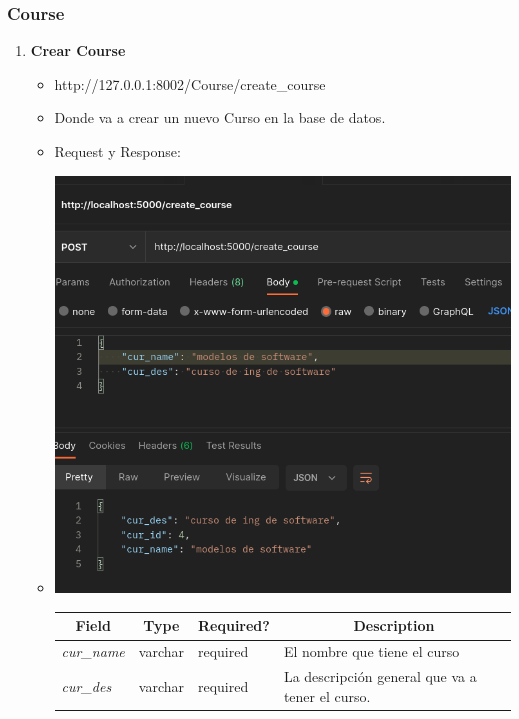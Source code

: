 \documentclass{article}
\begin{document}
\subsubsection{Course}
\begin{enumerate}
    \item \textbf{Crear Course}
    \begin{itemize}
        \item http://127.0.0.1:8002/Course/create\_course
        \item Donde va a crear un nuevo Curso en la base de datos.
        \item Request y Response:
        \item \includegraphics[scale=.5]{assets/course/create.png}
        \begin{table}[H] \centering \begin{tabular}{|l|l|l|l|} \hline
        \multicolumn{1}{|c|}{\textbf{Field}} &
        \multicolumn{1}{c|}{\textbf{Type}} &
        \multicolumn{1}{c|}{\textbf{Required?}} &
        \multicolumn{1}{c|}{\textbf{Description}} \\ \hline \textit{cur\_name} &
        varchar & required & El nombre que tiene el curso \\ \hline
        \textit{cur\_des} & varchar & required & La descripción general que va a
        tener el curso. \\ \hline \end{tabular} \end{table}

\end{itemize}
\end{enumerate}
\end{document}
